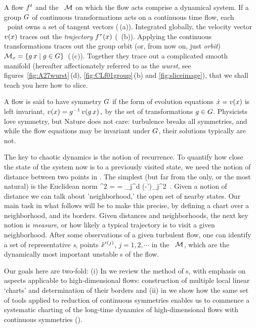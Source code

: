 \documentclass[aip,cha,reprint,
secnumarabic,
nofootinbib, tightenlines,
nobibnotes, showkeys, showpacs,
]{revtex4-1}
\begin{document}
A flow $f^t$ and the \statesp\ ${\cal M}$ on which the flow acts comprise a
{dynamical system}. If a group $G$ of continuous transformations
acts on a continuous time flow, each \statesp\ point owns a set of
tangent vectors (\,(a)). Integrated globally, the
velocity vector $v(x)$ traces out the {\em trajectory}
${f^{\tau}(x)}$ ( \,(b)). Applying the continuous
transformations traces out the {group orbit} (or, from now on, just
\emph{orbit})
\(
{\cal M}_{x} = \{g\,x \mid g \in {\ensuremath{G}}\}
\,
\) %
(\,(c)). Together they trace out a complicated smooth
manifold (hereafter affectionately referred to as the {\em wurst}, see
figures~\ref{fig:A27wurst}\,(d), \ref{fig:CLf01group}\,(b) and
\ref{fig:sliceimage}), that we shall teach you here how to slice.

A flow is said to have symmetry $G$ if the form of evolution
equations $\dot{x} = v(x)$ is left invariant,
\(
v(x)=g^{-1} \, v(g \, x)
\,,
\) %
by the set of transformations $g \in {\ensuremath{G}}$. Physicists love
symmetry, but Nature does not care: turbulence breaks all symmetries,
and while the flow equations may be invariant under $G$, their
solutions typically are not.

The key to chaotic dynamics is the notion of recurrence. To quantify how
close the state of the system now is to a previously visited state, we
need the notion of distance between two points in \statesp. The simplest
(but far from the only, or the most natural) is the Euclidean norm
\beq
  ^2  =  =
\sum_j^d
(\ssp-\ssp')_j^2
\,.
Given a notion of distance we can talk about 'neighborhood,' the open set of
nearby states. Our main task in what follows will be to make this precise,
by defining a chart over a neighborhood, and its borders.
Given distances and neighborhoods,
the next key notion is  \emph{measure}, or how likely a typical
trajectory is to visit a given neighborhood. After some observations of a
given turbulent flow, one can identify a set of representative
\emph{\template s}, {points}
${\hat{x}'}{}^{(j)}$, $j=1,2,\cdots$ in the \statesp\ ${\cal M}$, which are the
dynamically most important unstable {\recurrStr s} of the flow.

Our goals here are two-fold:
(i) In  we review the method of \PoincSec s, with
    emphasis on aspects applicable to high-dimensional flows: construction of
    multiple local linear `charts' and determination of their borders and
(ii) in  we show how the same set of tools applied to
    reduction of continuous symmetries enables us to commence a
    systematic charting of the long-time dynamics of high-dimensional
    flows with continuous symmetries ().
\end{document}
